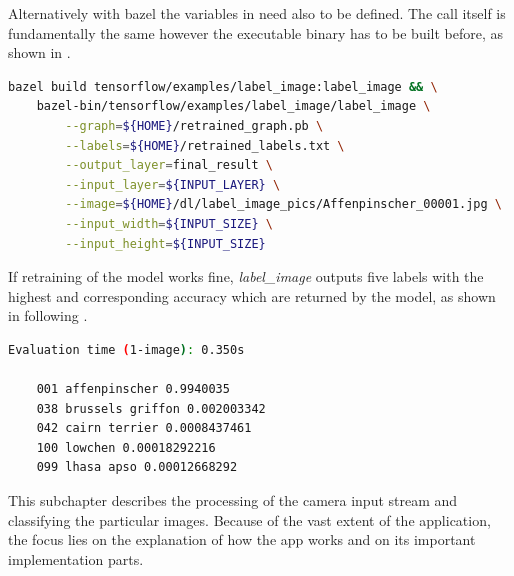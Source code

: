 Alternatively with bazel the variables in  need also to be defined. The call itself is fundamentally the same however the executable binary has to be built before, as shown in .

\begin{minipage}{\linewidth}
\begin{lstlisting}[caption=Build and call of \textit{label\_image}, label=list:blabel_image, language=bash]
	bazel build tensorflow/examples/label_image:label_image && \
	bazel-bin/tensorflow/examples/label_image/label_image \
		--graph=${HOME}/retrained_graph.pb \
		--labels=${HOME}/retrained_labels.txt \
		--output_layer=final_result \
		--input_layer=${INPUT_LAYER} \
		--image=${HOME}/dl/label_image_pics/Affenpinscher_00001.jpg \
		--input_width=${INPUT_SIZE} \
		--input_height=${INPUT_SIZE}
\end{lstlisting}
\end{minipage}

If retraining of the model works fine, \textit{label\_image} outputs five labels with the highest and corresponding accuracy which are returned by the model, as shown in following .

\begin{minipage}{\linewidth}
\begin{lstlisting}[caption=Output of \textit{label\_image.py}, label=list:label_imageOutput, language=bash]
	Evaluation time (1-image): 0.350s
	
	001 affenpinscher 0.9940035
	038 brussels griffon 0.002003342
	042 cairn terrier 0.0008437461
	100 lowchen 0.00018292216
	099 lhasa apso 0.00012668292
\end{lstlisting}
\end{minipage}




This subchapter describes the processing of the camera input stream and classifying the particular images. Because of the vast extent of the application, the focus lies on the explanation of how the app works and on its important implementation parts. \\

